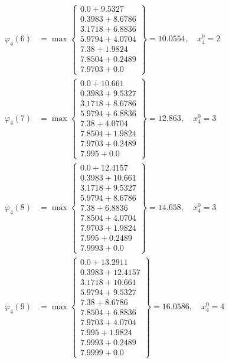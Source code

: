 \documentclass{article}
\begin{document}
\begin{align*}
\varphi_{4}(6) &= \max \left\{ \begin{array}{c}
0.0 + 9.5327 \\
 0.3983 + 8.6786 \\
 3.1718 + 6.8836 \\
 5.9794 + 4.0704 \\
 7.38 + 1.9824 \\
 7.8504 + 0.2489 \\
 7.9703 + 0.0
\end{array} \right\}=10.0554, \quad x_{4}^0=2\\
  
\varphi_{4}(7) &= \max \left\{ \begin{array}{c}
0.0 + 10.661 \\
 0.3983 + 9.5327 \\
 3.1718 + 8.6786 \\
 5.9794 + 6.8836 \\
 7.38 + 4.0704 \\
 7.8504 + 1.9824 \\
 7.9703 + 0.2489 \\
 7.995 + 0.0
\end{array} \right\}=12.863, \quad x_{4}^0=3\\
  
\varphi_{4}(8) &= \max \left\{ \begin{array}{c}
0.0 + 12.4157 \\
 0.3983 + 10.661 \\
 3.1718 + 9.5327 \\
 5.9794 + 8.6786 \\
 7.38 + 6.8836 \\
 7.8504 + 4.0704 \\
 7.9703 + 1.9824 \\
 7.995 + 0.2489 \\
 7.9993 + 0.0
\end{array} \right\}=14.658, \quad x_{4}^0=3\\
  
\varphi_{4}(9) &= \max \left\{ \begin{array}{c}
0.0 + 13.2911 \\
 0.3983 + 12.4157 \\
 3.1718 + 10.661 \\
 5.9794 + 9.5327 \\
 7.38 + 8.6786 \\
 7.8504 + 6.8836 \\
 7.9703 + 4.0704 \\
 7.995 + 1.9824 \\
 7.9993 + 0.2489 \\
 7.9999 + 0.0
\end{array} \right\}=16.0586, \quad x_{4}^0=4\\
  

\end{align*}
\end{document}
